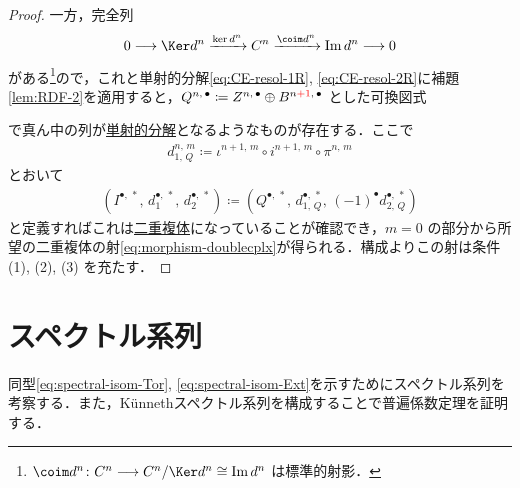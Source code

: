 \documentclass[algtopo_main]{subfiles}
\begin{document}
\begin{proof}
    一方，完全列
    \begin{align}
        0 \lto \Ker d^{n} \xrightarrow{\ker d^{n}} C^{n} \xrightarrow{\coim d^{n}} \Im d^{n} \lto 0
    \end{align}
    がある\footnote{$\coim d^n \colon C^n \lto C^n / \Ker d^n \cong \Im d^n$ は標準的射影．}ので，これと単射的分解\eqref{eq:CE-resol-1R}, \eqref{eq:CE-resol-2R}に補題\ref{lem:RDF-2}を適用すると，$Q^{n,\, \bullet} \coloneqq Z^{n,\, \bullet} \oplus B^{n \textcolor{red}{+1},\, \bullet}$ とした可換図式
    \begin{center}
    \end{center}
    で真ん中の列が\hyperref[def:injective-resolution]{単射的分解}となるようなものが存在する．ここで
    \begin{align}
        d_{1,\, Q}^{n,\, m} \coloneqq \iota^{n+1,\, m} \circ i^{n+1,\, m} \circ \pi^{n,\, m}
    \end{align}
    とおいて
    \begin{align}
        (I^{\bullet,\, *},\, d_1^{\bullet,\, *},\, d_2^{\bullet,\, *}) \coloneqq (Q^{\bullet,\, *},\, d_{1,\, Q}^{\bullet,\, *},\, (-1)^\bullet d_{2,\, Q}^{\bullet,\, *})
    \end{align}
    と定義すればこれは\hyperref[def:double-complex]{二重複体}になっていることが確認でき，$m=0$ の部分から所望の二重複体の射\eqref{eq:morphism-doublecplx}が得られる．構成よりこの射は条件 (1), (2), (3) を充たす．
\end{proof}


\section{スペクトル系列}

同型\eqref{eq:spectral-isom-Tor}, \eqref{eq:spectral-isom-Ext}を示すためにスペクトル系列を考察する．また，K\"unnethスペクトル系列を構成することで普遍係数定理を証明する．
\end{document}
